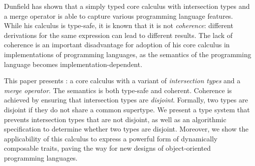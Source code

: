 Dunfield has shown that a simply typed core calculus with intersection types and
a merge operator is able to capture various programming language features. While
his calculus is type-safe, it is known that it is not \emph{coherence}:
different derivations for the same expression can lead to different results. The
lack of coherence is an important disadvantage for adoption of his core calculus
in implementations of programming languages, as the semantics of the programming
language becomes implementation-dependent.

This paper presents \name: a core calculus with a variant of \emph{intersection
types} and a \emph{merge operator}. The semantics \name is both type-safe and
coherent. Coherence is achieved by ensuring that intersection types are
\emph{disjoint}. Formally, two types are disjoint if they do not share a common
supertype. We present a type system that prevents intersection types that are
not disjoint, as well as an algorithmic specification to determine whether two
types are disjoint. Moreover, we show the applicability of this calculus to
express a powerful form of dynamically composable traits, paving the way for new
designs of object-oriented programming languages.
